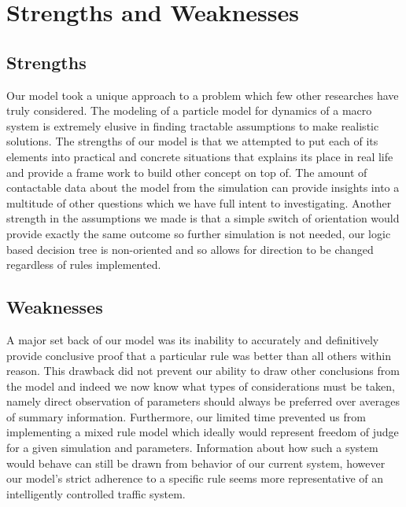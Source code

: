 \documentclass{amsart}
\begin{document}
\section{\bfseries{Strengths and Weaknesses}}
	\subsection{Strengths}
		Our model took a unique approach to a problem which few other researches have truly considered. The modeling of a particle model for dynamics of a macro system is extremely elusive in finding tractable assumptions to make realistic solutions. The strengths of our model is that we attempted to put each of its elements into practical and concrete situations that explains its place in real life and  provide a frame work to build other concept on top of. The amount of contactable data about the model from the simulation can provide insights into a multitude of other questions which we have full intent to investigating. Another strength in the assumptions we made is that a simple switch of orientation would provide exactly the same outcome so further simulation is not needed, our logic based decision tree is non-oriented and so allows for direction to be changed regardless of rules implemented.
	\subsection{Weaknesses}
		A major set back of our model was its inability to accurately and definitively provide conclusive proof that a particular rule was better than all others within reason. This drawback did not prevent our ability to draw other conclusions from the model and indeed we now know what types of considerations must be taken, namely direct observation of parameters should always be preferred over averages of summary information. Furthermore, our limited time prevented us from implementing a mixed rule model which ideally would represent freedom of judge for a given simulation and parameters. Information about how such a system would behave can still be drawn from behavior of our current system, however our model's strict adherence to a specific rule seems more representative of an intelligently controlled traffic system. 
\end{document}
